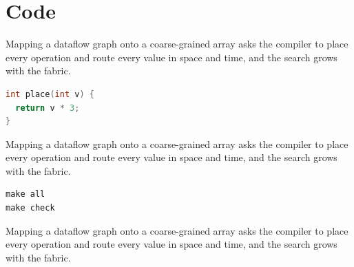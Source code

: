 \documentclass{article}
\begin{document}
\section{Code}
Mapping a dataflow graph onto a coarse-grained array asks the compiler to place every operation and route every value in space and time, and the search grows with the fabric.
\begin{algorithm}[h]
\caption{Map}\label{alg:m}
\;
\end{algorithm}
\begin{lstlisting}[language=C]
int place(int v) {
  return v * 3;
}
\end{lstlisting}
Mapping a dataflow graph onto a coarse-grained array asks the compiler to place every operation and route every value in space and time, and the search grows with the fabric.
\begin{verbatim}
make all
make check
\end{verbatim}
Mapping a dataflow graph onto a coarse-grained array asks the compiler to place every operation and route every value in space and time, and the search grows with the fabric.
\end{document}
